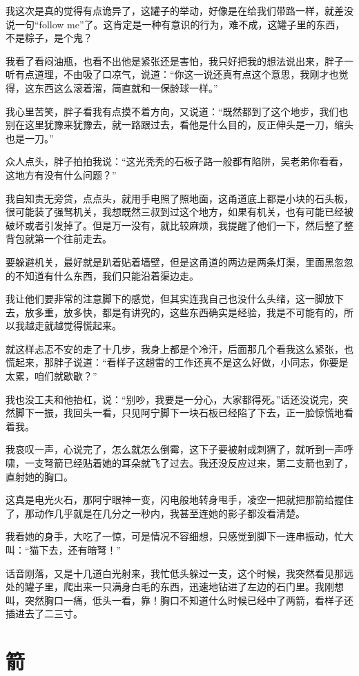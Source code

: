 我这次是真的觉得有点诡异了，这罐子的举动，好像是在给我们带路一样，就差没说一句“follow me”了。这肯定是一种有意识的行为，难不成，这罐子里的东西，不是粽子，是个鬼？

我看了看闷油瓶，也看不出他是紧张还是害怕，我只好把我的想法说出来，胖子一听有点道理，不由吸了口凉气，说道：“你这一说还真有点这个意思，我刚才也觉得，这东西这么滚着溜，简直就和一保龄球一样。”

我心里苦笑，胖子看我有点摸不着方向，又说道：“既然都到了这个地步，我们也别在这里犹豫来犹豫去，就一路跟过去，看他是什么目的，反正伸头是一刀，缩头也是一刀。”

众人点头，胖子拍拍我说：“这光秃秃的石板子路一般都有陷阱，吴老弟你看看，这地方有没有什么问题？”

我自知责无旁贷，点点头，就用手电照了照地面，这甬道底上都是小块的石头板，很可能装了强驽机关，我想既然三叔到过这个地方，如果有机关，也有可能已经被破坏或者引发掉了。但是万一没有，就比较麻烦，我提醒了他们一下，然后整了整背包就第一个往前走去。

要躲避机关，最好就是趴着贴着墙壁，但是这甬道的两边是两条灯渠，里面黑忽忽的不知道有什么东西，我们只能沿着渠边走。

我让他们要非常的注意脚下的感觉，但其实连我自己也没什么头绪，这一脚放下去，放多重，放多快，都是有讲究的，这些东西确实是经验，我是不可能有的，所以我越走就越觉得慌起来。

就这样忐忑不安的走了十几步，我身上都是个冷汗，后面那几个看我这么紧张，也慌起来，那胖子说道：“看样子这趟雷的工作还真不是这么好做，小同志，你要是太累，咱们就歇歇？”

我也没工夫和他抬杠，说：“别吵，我要是一分心，大家都得死。”话还没说完，突然脚下一振，我回头一看，只见阿宁脚下一块石板已经陷了下去，正一脸惊慌地看着我。

我哀叹一声，心说完了，怎么就怎么倒霉，这下子要被射成刺猬了，就听到一声呼啸，一支弩箭已经贴着她的耳朵就飞了过去。我还没反应过来，第二支箭也到了，直射她的胸口。

这真是电光火石，那阿宁眼神一变，闪电般地转身甩手，凌空一把就把那箭给握住了，那动作几乎就是在几分之一秒内，我甚至连她的影子都没看清楚。

我看她的身手，大吃了一惊，可是情况不容细想，只感觉到脚下一连串振动，忙大叫：“猫下去，还有暗弩！”

话音刚落，又是十几道白光射来，我忙低头躲过一支，这个时候，我突然看见那远处的罐子里，爬出来一只满身白毛的东西，迅速地钻进了左边的石门里。我刚想叫，突然胸口一痛，低头一看，靠！胸口不知道什么时候已经中了两箭，看样子还插进去了二三寸。

\chapter{箭}

